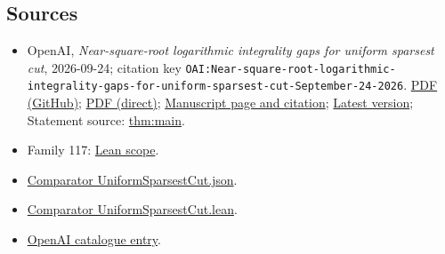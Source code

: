 \documentclass[11pt]{article}
\begin{document}
\subsection{Sources}
\begin{itemize}
\item OpenAI, \emph{Near-square-root logarithmic integrality gaps for uniform sparsest cut}, 2026-09-24; citation key \texttt{OAI:Near-square-root-logarithmic-integrality-gaps-for-uniform-sparsest-cut-September-24-2026}. \href{https://github.com/openai/math/blob/adc7f1241b42e322a6451854ab7e4b4c146bf78a/preprints/Near-square-root-logarithmic-integrality-gaps-for-uniform-sparsest-cut-September-24-2026/Near-square-root-logarithmic-integrality-gaps-for-uniform-sparsest-cut-September-24-2026.pdf}{PDF (GitHub)}; \href{https://github.com/openai/math/raw/adc7f1241b42e322a6451854ab7e4b4c146bf78a/preprints/Near-square-root-logarithmic-integrality-gaps-for-uniform-sparsest-cut-September-24-2026/Near-square-root-logarithmic-integrality-gaps-for-uniform-sparsest-cut-September-24-2026.pdf}{PDF (direct)}; \href{https://github.com/openai/math/blob/adc7f1241b42e322a6451854ab7e4b4c146bf78a/preprints/Near-square-root-logarithmic-integrality-gaps-for-uniform-sparsest-cut-September-24-2026/README.md}{Manuscript page and citation}; \href{https://github.com/openai/math/blob/main/preprints/Near-square-root-logarithmic-integrality-gaps-for-uniform-sparsest-cut-September-24-2026/Near-square-root-logarithmic-integrality-gaps-for-uniform-sparsest-cut-September-24-2026.pdf}{Latest version}; Statement source: \href{https://github.com/openai/math/blob/adc7f1241b42e322a6451854ab7e4b4c146bf78a/preprints/Near-square-root-logarithmic-integrality-gaps-for-uniform-sparsest-cut-September-24-2026/build/source/main.tex\#L152}{thm:main}.
\item Family 117: \href{https://github.com/openai/math/blob/adc7f1241b42e322a6451854ab7e4b4c146bf78a/lean/docs/117.md}{Lean scope}.
\item \href{https://github.com/openai/math/blob/adc7f1241b42e322a6451854ab7e4b4c146bf78a/lean/ComparatorChallenges/UniformSparsestCut.json}{Comparator UniformSparsestCut.json}.
\item \href{https://github.com/openai/math/blob/adc7f1241b42e322a6451854ab7e4b4c146bf78a/lean/ComparatorChallenges/UniformSparsestCut.lean}{Comparator UniformSparsestCut.lean}.
\item \href{https://github.com/openai/math/blob/adc7f1241b42e322a6451854ab7e4b4c146bf78a/CONTENTS.md}{OpenAI catalogue entry}.
\end{itemize}
\end{document}
